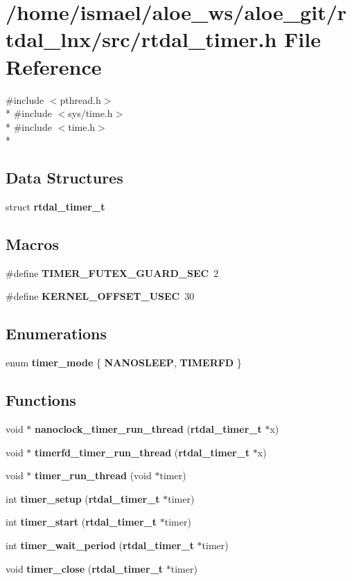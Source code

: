 \section{/home/ismael/aloe\-\_\-ws/aloe\-\_\-git/rtdal\-\_\-lnx/src/rtdal\-\_\-timer.h File Reference}
\label{rtdal__timer_8h}
{\ttfamily \#include $<$pthread.\-h$>$}\\*
{\ttfamily \#include $<$sys/time.\-h$>$}\\*
{\ttfamily \#include $<$time.\-h$>$}\\*
\subsection*{Data Structures}
\begin{DoxyCompactItemize}
\item 
struct {\bf rtdal\-\_\-timer\-\_\-t}
\end{DoxyCompactItemize}
\subsection*{Macros}
\begin{DoxyCompactItemize}
\item 
\#define {\bf T\-I\-M\-E\-R\-\_\-\-F\-U\-T\-E\-X\-\_\-\-G\-U\-A\-R\-D\-\_\-\-S\-E\-C}~2
\item 
\#define {\bf K\-E\-R\-N\-E\-L\-\_\-\-O\-F\-F\-S\-E\-T\-\_\-\-U\-S\-E\-C}~30
\end{DoxyCompactItemize}
\subsection*{Enumerations}
\begin{DoxyCompactItemize}
\item 
enum {\bf timer\-\_\-mode} \{ {\bf N\-A\-N\-O\-S\-L\-E\-E\-P}, 
{\bf T\-I\-M\-E\-R\-F\-D}
 \}
\end{DoxyCompactItemize}
\subsection*{Functions}
\begin{DoxyCompactItemize}
\item 
void $\ast$ {\bf nanoclock\-\_\-timer\-\_\-run\-\_\-thread} ({\bf rtdal\-\_\-timer\-\_\-t} $\ast$x)
\item 
void $\ast$ {\bf timerfd\-\_\-timer\-\_\-run\-\_\-thread} ({\bf rtdal\-\_\-timer\-\_\-t} $\ast$x)
\item 
void $\ast$ {\bf timer\-\_\-run\-\_\-thread} (void $\ast$timer)
\item 
int {\bf timer\-\_\-setup} ({\bf rtdal\-\_\-timer\-\_\-t} $\ast$timer)
\item 
int {\bf timer\-\_\-start} ({\bf rtdal\-\_\-timer\-\_\-t} $\ast$timer)
\item 
int {\bf timer\-\_\-wait\-\_\-period} ({\bf rtdal\-\_\-timer\-\_\-t} $\ast$timer)
\item 
void {\bf timer\-\_\-close} ({\bf rtdal\-\_\-timer\-\_\-t} $\ast$timer)
\end{DoxyCompactItemize}


